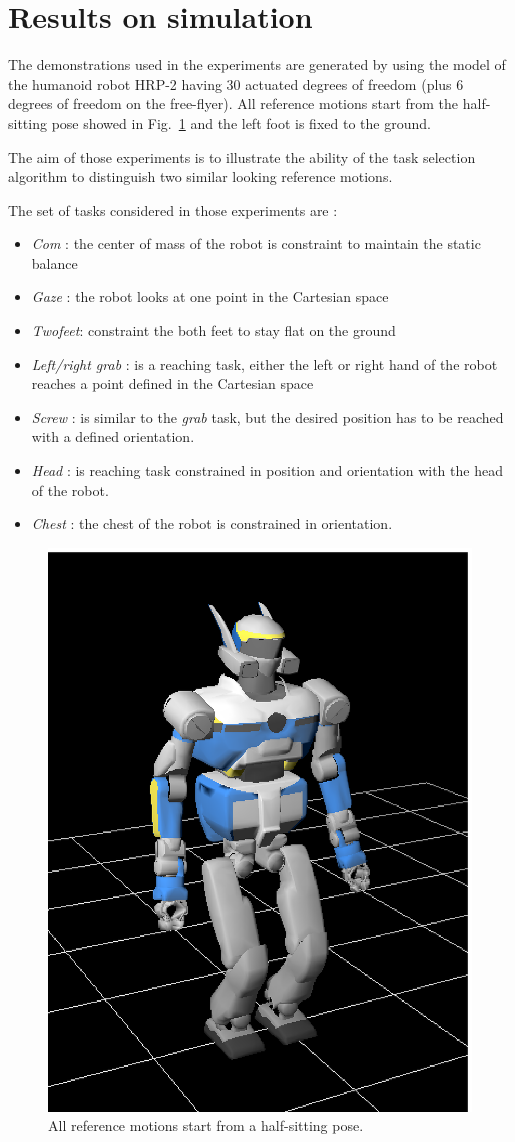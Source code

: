 \documentclass[letterpaper, 10pt, conference]{ieeeconf}      %
\begin{document}
\section{Results on simulation}
The demonstrations used in the experiments are generated by using the model
of the humanoid robot HRP-2 having 30 actuated degrees of freedom (plus 6 degrees of freedom on the
free-flyer). All reference motions start from the half-sitting pose showed in Fig.~\ref{fig:halfSit} and
the left foot is fixed to the ground.

The aim of those experiments is to illustrate the ability of the
task selection algorithm to distinguish two similar looking reference motions.

The set of tasks considered in those experiments are :

\begin{itemize}
  \item \emph{Com} : the center of mass of the robot is constraint to maintain the static balance
  \item \emph{Gaze} : the robot looks at one point in the Cartesian space
  \item \emph{Twofeet}: constraint the both feet to stay flat on the ground
  \item \emph{Left/right grab} : is a reaching task, either the left or right hand
of the robot reaches a point defined in the Cartesian space
  \item \emph{Screw} : is similar to the \emph{grab} task, but the desired position
has to be reached with a defined orientation.
  \item \emph{Head} : is reaching task constrained in position and orientation with the head of the
    robot.
  \item \emph{Chest} : the chest of the robot is constrained in orientation.  
\end{itemize}
\begin{figure}[t]
\begin{center}
\includegraphics[width=0.3\linewidth]{img/halfSit.ps}
\end{center}
\caption{All reference motions start from a half-sitting pose.}
\label{fig:halfSit}
\end{figure}
\end{document}
